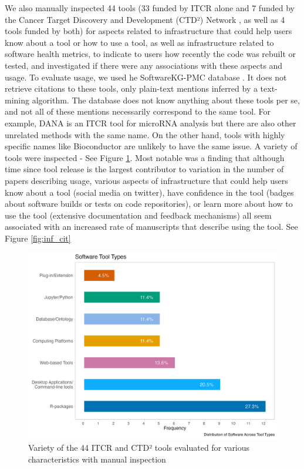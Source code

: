 \documentclass{article}
\begin{document}
We also manually inspected 44 tools (33 funded by ITCR alone and 7 funded by the Cancer Target Discovery and Development (CTD²) Network \cite{aksoy_ctd2_2017}, as well as 4 tools funded by both) for aspects related to infrastructure that could help users know about a tool or how to use a tool, as well as infrastructure related to software health metrics, to indicate to users how recently the code was rebuilt or tested,  and investigated if there were any associations with these aspects and usage. To evaluate usage, we used he SoftwareKG-PMC database \cite{Usage}. It does not retrieve citations to these tools, only plain-text mentions inferred by a text-mining algorithm. The database does not know anything about these tools per se, and not all of these mentions necessarily correspond to the same tool. For example, DANA is an ITCR tool for microRNA analysis but there are also other unrelated methods with the same name. On the other hand, tools with highly specific names like Bioconductor are unlikely to have the same issue. A variety of tools were inspected - See Figure \ref{fig:tool_eval}. Most notable was a finding that although time since tool release is the largest contributor to variation in the number of papers describing usage, various aspects of infrastructure that could help users know about a tool (social media on twitter), have confidence in the tool (badges about software builds or tests on code repositories), or learn more about how to use the tool (extensive documentation and feedback mechanisms) all seem associated with an increased rate of manuscripts that describe using the tool. See Figure \ref{fig:inf_cit}

\begin{figure}[H] 
    \centering
\includegraphics[width=\textwidth,height=\textheight,keepaspectratio]{images/software_tool_types.png}
    \caption{Variety of the 44 ITCR and CTD² tools evaluated for various characteristics with manual inspection}
    \label{fig:tool_eval}
\end{figure}
\end{document}
